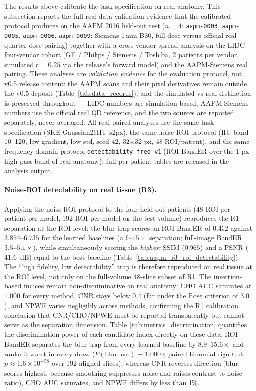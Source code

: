 \documentclass[twoside,11pt]{article}
\begin{document}
The results above calibrate the task specification on real anatomy. This subsection reports the full real-data validation evidence that the calibrated protocol produces on the AAPM 2016 held-out test ($n=4$: \texttt{aapm-0003}, \texttt{aapm-0005}, \texttt{aapm-0006}, \texttt{aapm-0009}; Siemens 1\,mm B30, full-dose versus official real quarter-dose pairing) together with a cross-vendor spread analysis on the LIDC four-vendor cohort (GE / Philips / Siemens / Toshiba, 2 patients per vendor, simulated $r=0.25$ via the release's forward model) and the AAPM-Siemens real pairing. These analyses are \emph{validation evidence} for the evaluation protocol, not v0.5 release content: the AAPM scans and their pixel derivatives remain outside the v0.5 deposit (Table~\ref{tab:data_records}), and the simulated-vs-real distinction is preserved throughout --- LIDC numbers are simulation-based, AAPM-Siemens numbers use the official real QD reference, and the two sources are reported separately, never averaged. All real-paired analyses use the same task specification (SKE-Gaussian20HU-s2px), the same noise-ROI protocol (HU band 10--120, low gradient, low std, seed 42, 32$\times$32 px, 48 ROI/patient), and the same frequency-domain protocol \texttt{detectability-freq-v1} (ROI BandER over the 1-px high-pass band of real anatomy); full per-patient tables are released in the analysis output.

\paragraph{Noise-ROI detectability on real tissue (R3).}
Applying the noise-ROI protocol to the four held-out patients (48 ROI per patient per model, 192 ROI per model on the test volume) reproduces the R1 separation at the ROI level: the blur trap scores an ROI BandER of $0.432$ against $3.854$--$6.735$ for the learned baselines (a $9$--$15\times$ separation; full-image BandER $3.5$--$5.1\times$), while simultaneously scoring the \emph{highest} SSIM ($0.965$) and a PSNR ($41.6$~dB) equal to the best baseline (Table~\ref{tab:aapm_r3_roi_detectability}). The ``high fidelity, low detectability'' trap is therefore reproduced on real tissue at the ROI level, not only on the full-volume 48-slice subset of R1. The insertion-based indices remain non-discriminative on real anatomy: CHO AUC saturates at $1.000$ for every method, CNR stays below $0.4$ (far under the Rose criterion of $3.0$), and NPWE varies negligibly across methods, confirming the R1 calibration conclusion that CNR/CHO/NPWE must be reported transparently but cannot serve as the separation dimension. Table~\ref{tab:metrics_discrimination} quantifies the discrimination power of each candidate index directly on these data: ROI BandER separates the blur trap from every learned baseline by $8.9$--$15.6\times$ and ranks it worst in every draw ($P(\mathrm{blur~last})=1.0000$; paired binomial sign test $p\approx1.6\times10^{-58}$ over 192 aligned slices), whereas CNR reverses direction (blur scores highest, because smoothing suppresses noise and raises contrast-to-noise ratio), CHO AUC saturates, and NPWE differs by less than 1\%.
\end{document}
